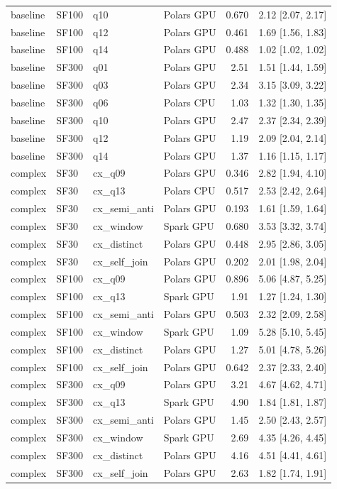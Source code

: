 \begin{longtable}{llllrr}
baseline & SF100 & q10 & Polars GPU & 0.670 & 2.12 [2.07, 2.17] \\
baseline & SF100 & q12 & Polars GPU & 0.461 & 1.69 [1.56, 1.83] \\
baseline & SF100 & q14 & Polars GPU & 0.488 & 1.02 [1.02, 1.02] \\
baseline & SF300 & q01 & Polars GPU & 2.51 & 1.51 [1.44, 1.59] \\
baseline & SF300 & q03 & Polars GPU & 2.34 & 3.15 [3.09, 3.22] \\
baseline & SF300 & q06 & Polars CPU & 1.03 & 1.32 [1.30, 1.35] \\
baseline & SF300 & q10 & Polars GPU & 2.47 & 2.37 [2.34, 2.39] \\
baseline & SF300 & q12 & Polars GPU & 1.19 & 2.09 [2.04, 2.14] \\
baseline & SF300 & q14 & Polars GPU & 1.37 & 1.16 [1.15, 1.17] \\
complex & SF30 & cx\_q09 & Polars GPU & 0.346 & 2.82 [1.94, 4.10] \\
complex & SF30 & cx\_q13 & Polars CPU & 0.517 & 2.53 [2.42, 2.64] \\
complex & SF30 & cx\_semi\_anti & Polars GPU & 0.193 & 1.61 [1.59, 1.64] \\
complex & SF30 & cx\_window & Spark GPU & 0.680 & 3.53 [3.32, 3.74] \\
complex & SF30 & cx\_distinct & Polars GPU & 0.448 & 2.95 [2.86, 3.05] \\
complex & SF30 & cx\_self\_join & Polars GPU & 0.202 & 2.01 [1.98, 2.04] \\
complex & SF100 & cx\_q09 & Polars GPU & 0.896 & 5.06 [4.87, 5.25] \\
complex & SF100 & cx\_q13 & Spark GPU & 1.91 & 1.27 [1.24, 1.30] \\
complex & SF100 & cx\_semi\_anti & Polars GPU & 0.503 & 2.32 [2.09, 2.58] \\
complex & SF100 & cx\_window & Spark GPU & 1.09 & 5.28 [5.10, 5.45] \\
complex & SF100 & cx\_distinct & Polars GPU & 1.27 & 5.01 [4.78, 5.26] \\
complex & SF100 & cx\_self\_join & Polars GPU & 0.642 & 2.37 [2.33, 2.40] \\
complex & SF300 & cx\_q09 & Polars GPU & 3.21 & 4.67 [4.62, 4.71] \\
complex & SF300 & cx\_q13 & Spark GPU & 4.90 & 1.84 [1.81, 1.87] \\
complex & SF300 & cx\_semi\_anti & Polars GPU & 1.45 & 2.50 [2.43, 2.57] \\
complex & SF300 & cx\_window & Spark GPU & 2.69 & 4.35 [4.26, 4.45] \\
complex & SF300 & cx\_distinct & Polars GPU & 4.16 & 4.51 [4.41, 4.61] \\
complex & SF300 & cx\_self\_join & Polars GPU & 2.63 & 1.82 [1.74, 1.91] \\
\end{longtable}
